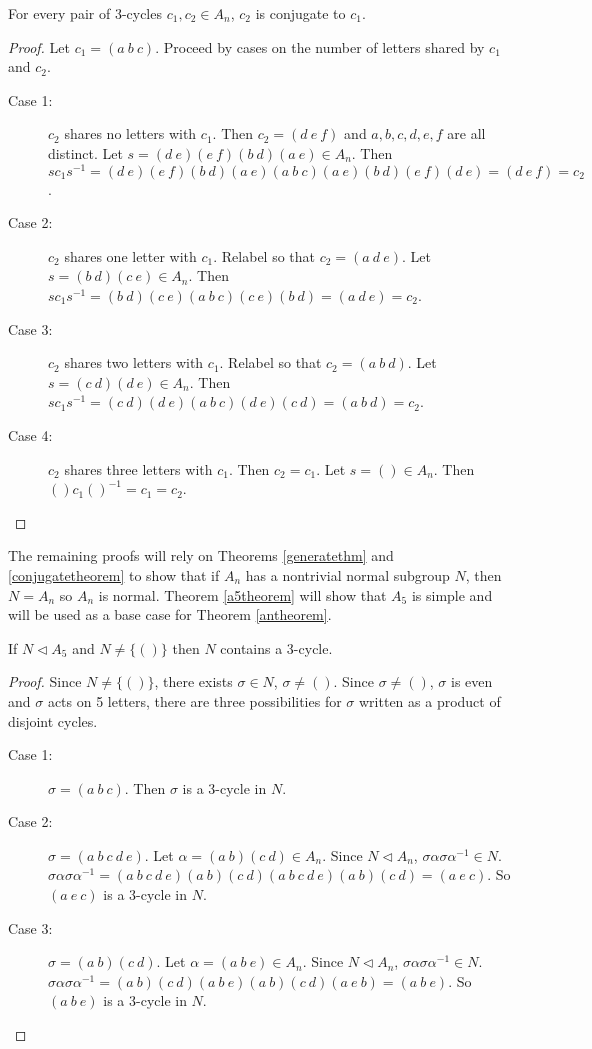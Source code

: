 \documentclass[a4paper]{article}
\begin{document}
\begin{theorem}
\label{conjugatetheorem}
For every pair of 3-cycles $c_1, c_2 \in A_n$, $c_2$ is conjugate to $c_1$.
\end{theorem}
\begin{proof}
Let $c_1 = (a\ b\ c)$. Proceed by cases on the number of letters shared by $c_1$ and $c_2$.
\begin{description}
   \item[Case 1:]$c_2$ shares no letters with $c_1$.
   Then $c_2 = (d\ e\ f)$ and $a, b, c, d, e, f$ are all distinct. Let $s = (d\ e)(e\ f)(b\ d)(a\ e) \in A_n$. Then $s c_1 s^{-1} = (d\ e)(e\ f)(b\ d)(a\ e)(a\ b\ c)(a\ e)(b\ d)(e\ f)(d\ e) = (d\ e\ f) = c_2$.
   \item[Case 2:]$c_2$ shares one letter with $c_1$.
   Relabel so that $c_2 = (a\ d\ e)$. Let $s = (b\ d)(c\ e) \in A_n$. Then $s c_1 s^{-1} = (b\ d)(c\ e)(a\ b\ c)(c\ e)(b\ d) = (a\ d\ e) = c_2$.
   \item[Case 3:]$c_2$ shares two letters with $c_1$.
   Relabel so that $c_2 = (a\ b\ d)$. Let $s = (c\ d)(d\ e) \in A_n$. Then $s c_1 s^{-1} = (c\ d)(d\ e)(a\ b\ c)(d\ e)(c\ d) = (a\ b\ d) = c_2$.
   \item[Case 4:]$c_2$ shares three letters with $c_1$.
   Then $c_2 = c_1$. Let $s = () \in A_n$. Then $() c_1 ()^{-1} = c_1 = c_2$.
\end{description}
\end{proof}

The remaining proofs will rely on Theorems \ref{generatethm} and \ref{conjugatetheorem} to show that if $A_n$ has a nontrivial normal subgroup $N$, then $N = A_n$ so $A_n$ is normal. Theorem \ref{a5theorem} will show that $A_5$ is simple and will be used as a base case for Theorem \ref{antheorem}.

\begin{lemma}
\label{threecyclelemma}
If $N \triangleleft A_5$ and $N \ne \{()\}$ then $N$ contains a 3-cycle.
\end{lemma}
\begin{proof}
Since $N \ne \{()\}$, there exists $\sigma \in N$, $\sigma \ne ()$. Since $\sigma \ne ()$, $\sigma$ is even and $\sigma$ acts on 5 letters, there are three possibilities for $\sigma$ written as a product of disjoint cycles.
\begin{description}
    \item[Case 1:]
    $\sigma = (a\ b\ c)$. Then $\sigma$ is a 3-cycle in $N$.
    \item[Case 2:]
    $\sigma = (a\ b\ c\ d\ e)$. Let $\alpha = (a\ b)(c\ d) \in A_n$. Since $N \triangleleft A_n$, $\sigma \alpha \sigma \alpha^{-1} \in N$. $\sigma \alpha \sigma \alpha^{-1} = (a\ b\ c\ d\ e)(a\ b)(c\ d)(a\ b\ c\ d\ e)(a\ b)(c\ d) = (a\ e\ c)$. So $(a\ e\ c)$ is a 3-cycle in $N$.
    \item[Case 3:]
    $\sigma = (a\ b)(c\ d)$. Let $\alpha = (a\ b\ e) \in A_n$. Since $N \triangleleft A_n$, $\sigma \alpha \sigma \alpha^{-1} \in N$. $\sigma \alpha \sigma \alpha^{-1} = (a\ b)(c\ d)(a\ b\ e)(a\ b)(c\ d)(a\ e\ b) = (a\ b\ e)$. So $(a\ b\ e)$ is a 3-cycle in $N$.
\end{description}
\end{proof}
\end{document}
